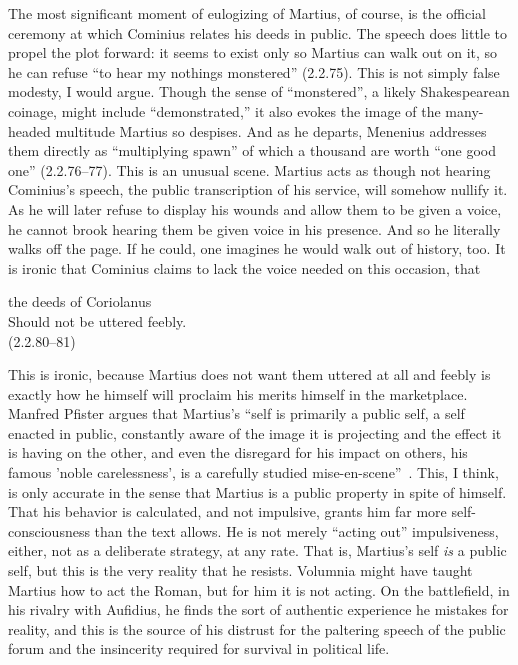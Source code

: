The most significant moment of eulogizing of Martius, of course, is the official ceremony at which Cominius relates his deeds in public.
The speech does little to propel the plot forward: it seems to exist only so Martius can walk out on it, so he can refuse ``to hear my nothings monstered'' (2.2.75).
This is not simply false modesty, I would argue.
Though the sense of ``monstered'', a likely Shakespearean coinage, might include ``demonstrated,'' it also evokes the image of the many-headed multitude Martius so despises.
And as he departs, Menenius addresses them directly as ``multiplying spawn'' of which a thousand are worth ``one good one'' (2.2.76--77).
This is an unusual scene.
Martius acts as though not hearing Cominius's speech, the public transcription of his service, will somehow nullify it.
As he will later refuse to display his wounds and allow them to be given a voice, he cannot brook hearing them be given voice in his presence.
And so he literally walks off the page.
If he could, one imagines he would walk out of history, too.
It is ironic that Cominius claims to lack the voice needed on this occasion, that
\begin{vq}
the deeds of Coriolanus\\
Should not be uttered feebly.\\
\hfill(2.2.80--81)
\end{vq}
This is ironic, because Martius does not want them uttered at all and feebly is exactly how he himself will proclaim his merits himself in the marketplace.
Manfred Pfister argues that Martius's ``self is primarily a public self, a self enacted in public, constantly aware of the image it is projecting and the effect it is having on the other, and even the disregard for his impact on others, his famous 'noble carelessness', is a carefully studied mise-en-scene''~\cite[42]{pfister_acting_2009}.
This, I think, is only accurate in the sense that Martius is a public property in spite of himself.
That his behavior is calculated, and not impulsive, grants him far more self-consciousness than the text allows.
He is not merely ``acting out'' impulsiveness, either, not as a deliberate strategy, at any rate.
That is, Martius's self \emph{is} a public self, but this is the very reality that he resists.
Volumnia might have taught Martius how to act the Roman, but for him it is not acting.
 On the battlefield, in his rivalry with Aufidius, he finds the sort of authentic experience he mistakes for reality, and this is the source of his distrust for the paltering speech of the public forum and the insincerity required for survival in political life.
